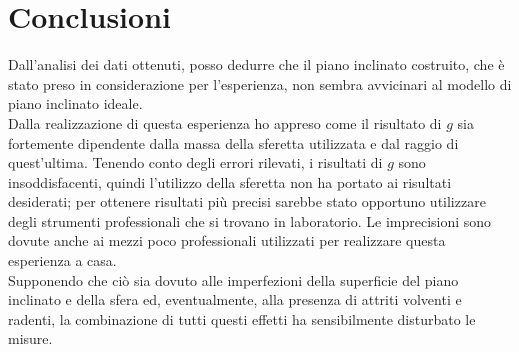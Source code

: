 \documentclass[a4paper, 12pt]{article} %
\begin{document}
\section{Conclusioni}
Dall'analisi dei dati ottenuti, posso dedurre che il piano inclinato costruito, che è stato preso in considerazione per l'esperienza, non sembra avvicinari al modello di piano inclinato ideale.\\
Dalla realizzazione di questa esperienza ho appreso come il risultato di $g$ sia fortemente dipendente dalla massa della sferetta utilizzata e dal raggio di quest'ultima. Tenendo conto degli errori rilevati, i risultati di $g$ sono insoddisfacenti, quindi l'utilizzo della sferetta non ha portato ai risultati desiderati; per ottenere risultati più precisi sarebbe stato opportuno utilizzare degli strumenti professionali che si trovano in laboratorio. Le imprecisioni sono dovute anche ai mezzi poco professionali utilizzati per realizzare questa esperienza a casa.\\
Supponendo che ciò sia dovuto alle imperfezioni della superficie del piano inclinato e della sfera ed, eventualmente, alla presenza di attriti volventi e radenti, la combinazione di tutti questi effetti ha sensibilmente disturbato le misure.
\end{document}
